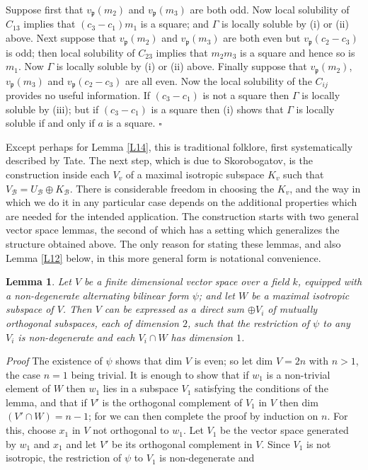 \documentclass[12pt]{article}
\def\fp{{\mathfrak p}}
\def\gG{{\Gamma}}
\def\sB{{\mathcal B}}
\def\qed{{\hfill$\square$}}
\def\ble{\begin{lemma} \label}
\def\ele{\end{lemma}}
\newtheorem{lemma}{Lemma}
\begin{document}
Suppose first that $v_\fp(m_2)$ and $v_\fp(m_3)$ are both odd.
Now local solubility of $C_{13}$ implies that $(c_3-c_1)m_1$ is a square;
and $\gG$ is locally soluble by (i) or (ii) above.
Next suppose that $v_\fp(m_2)$ and $v_\fp(m_3)$ are both even but
$v_\fp(c_2-c_3)$ is odd; then local solubility of $C_{23}$ implies that
$m_2m_3$ is a square and hence so is $m_1$. Now $\gG$ is locally soluble by
(i) or (ii) above.
Finally suppose that $v_\fp(m_2)$, $v_\fp(m_3)$ and $v_\fp(c_2-c_3)$ are all
even. Now the local solubility of the $C_{ij}$ provides no useful information.
If $(c_3-c_1)$ is not a square then $\gG$ is locally soluble by (iii); but if
$(c_3-c_1)$ is a square then (i) shows that $\gG$ is locally soluble if and
only if $a$ is a square.  \qed

\medskip

Except perhaps for Lemma \ref{L14}, this is traditional folklore, 
first systematically described by Tate. The next step, which is due to
Skorobogatov, is the construction inside each $V_v$ of a maximal isotropic
subspace $K_v$ such that $V_\sB=U_\sB\oplus K_\sB$. There is considerable
freedom in choosing the $K_v$, and the way in which
we do it in any particular case
depends on the additional properties which are needed for the intended
application. The
construction starts with two general vector space lemmas, the second of which
has a setting which generalizes the structure obtained above.
The only reason for stating these lemmas, and also Lemma
\ref{L12} below, in this more general
form is notational convenience.
\ble{L19} Let $V$ be a finite dimensional vector space over a field $k$,
equipped with a non-degenerate alternating bilinear form $\psi$; and let $W$
be a maximal isotropic subspace of $V$. Then $V$ can be expressed as a direct
sum $\oplus V_i$ of mutually orthogonal subspaces, each of dimension $2$, such
that the restriction of $\psi$ to any $V_i$ is non-degenerate and each
$V_i\cap W$ has dimension $1$.
\ele
\emph{Proof} The existence of $\psi$ shows that dim $V$ is even; so
let dim $V=2n$ with $n>1$, the case $n=1$ being trivial. It is enough to
show that if $w_1$ is a non-trivial element of $W$ then $w_1$ lies in a
subspace $V_1$ satisfying the conditions of the lemma, and that if $V'$
is the orthogonal complement of $V_1$ in $V$ then dim$(V'\cap W)=n-1$; for we
can then complete the proof by induction on $n$. For this, choose $x_1$ in
$V$ not orthogonal to $w_1$. Let $V_1$ be the vector space generated by $w_1$
and $x_1$ and let $V'$ be its orthogonal complement in $V$. Since $V_1$ is not
isotropic, the restriction of $\psi$ to $V_1$ is non-degenerate and
\end{document}
